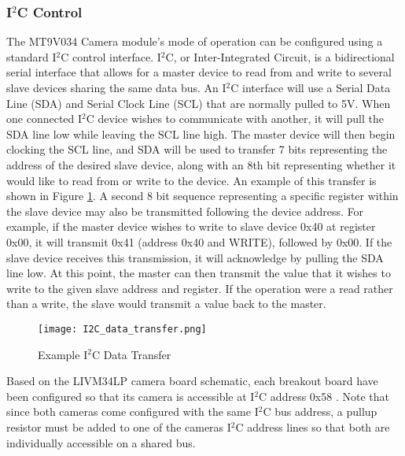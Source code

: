 \subsubsection{I$^2$C Control} \label{cameraI2Cdescription}
The MT9V034 Camera module's mode of operation can be configured using a standard I$^2$C control interface. I$^2$C, or Inter-Integrated Circuit, is a bidirectional serial interface that allows for a master device to read from and write to several slave devices sharing the same data bus. An I$^2$C interface will use a Serial Data Line (SDA) and Serial Clock Line (SCL) that are normally pulled to 5V. When one connected I$^2$C device wishes to communicate with another, it will pull the SDA line low while leaving the SCL line high. The master device will then begin clocking the SCL line, and SDA will be used to transfer 7 bits representing the address of the desired slave device, along with an 8th bit representing whether it would like to read from or write to the device. An example of this transfer is shown in Figure \ref{I2Cexample}. A second 8 bit sequence representing a specific register within the slave device may also be transmitted following the device address. For example, if the master device wishes to write to slave device 0x40 at register 0x00, it will transmit 0x41 (address 0x40 and WRITE), followed by 0x00. If the slave device receives this transmission, it will acknowledge by pulling the SDA line low. At this point, the master can then transmit the value that it wishes to write to the given slave address and register. If the operation were a read rather than a write, the slave would transmit a value back to the master.  
\par
\begin{figure}[H]
	\centerline{\texttt{[image: I2C\_data\_transfer.png]}}
	\caption{Example I$^2$C Data Transfer}
	\label{I2Cexample}
\end{figure}

Based on the LIVM34LP camera board schematic, each breakout board have been configured so that its camera is accessible at I$^2$C address 0x58 \cite{livm34lp,mt9v034}. Note that since both cameras come configured with the same I$^2$C bus address, a pullup resistor must be added to one of the cameras I$^2$C address lines so that both are individually accessible on a shared bus.

